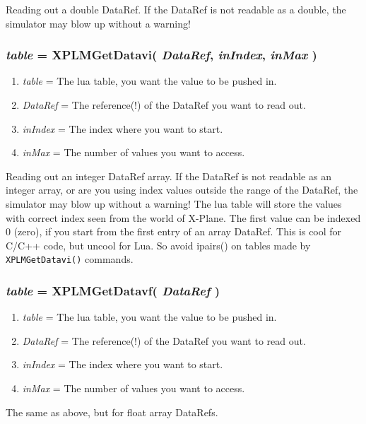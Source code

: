 \documentclass[11pt,parskip=half,a4paper]{scrartcl}
\begin{document}
Reading out a double DataRef. If the DataRef is not readable as a double, the simulator may blow up without a warning!

\subsubsection{\emph{table} = XPLMGetDatavi( \emph{DataRef}, \emph{inIndex}, \emph{inMax} )}

\begin{enumerate}
	\item \emph{table} = The lua table, you want the value to be pushed in.
	\item \emph{DataRef} = The reference(!) of the DataRef you want to read out.
	\item \emph{inIndex} = The index where you want to start.
	\item \emph{inMax} = The number of values you want to access.
\end{enumerate}

Reading out an integer DataRef array. If the DataRef is not readable as an integer array, or are you using index values outside the range of the DataRef, the simulator may blow up without a warning! The lua table will store the values with correct index seen from the world of X-Plane. The first value can be indexed 0 (zero), if you start from the first entry of an array DataRef. This is cool for C/C++ code, but uncool for Lua. So avoid ipairs() on tables made by \verb|XPLMGetDatavi()| commands.

\subsubsection{\emph{table} = XPLMGetDatavf( \emph{DataRef} )}

\begin{enumerate}
	\item \emph{table} = The lua table, you want the value to be pushed in.
	\item \emph{DataRef} = The reference(!) of the DataRef you want to read out.
	\item \emph{inIndex} = The index where you want to start.
	\item \emph{inMax} = The number of values you want to access.
\end{enumerate}

The same as above, but for float array DataRefs.

\vspace{4ex}
\end{document}
